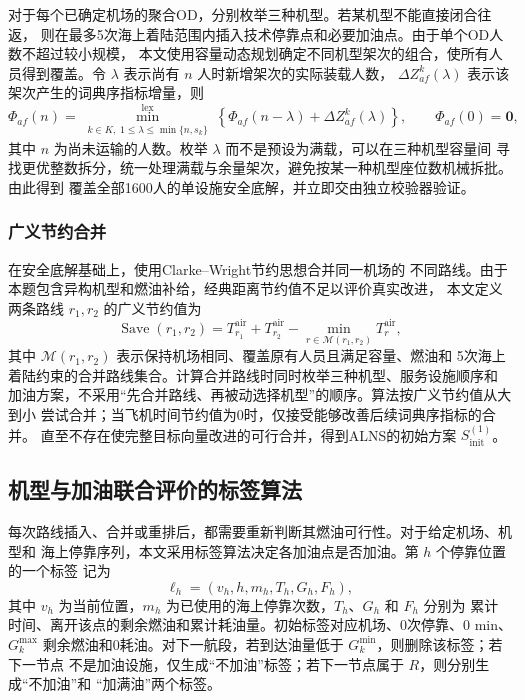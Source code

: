 \documentclass[UTF8,a4paper,zihao=5]{ctexart}
\begin{document}
对于每个已确定机场的聚合OD，分别枚举三种机型。若某机型不能直接闭合往返，
则在最多5次海上着陆范围内插入技术停靠点和必要加油点。由于单个OD人数不超过较小规模，
本文使用容量动态规划确定不同机型架次的组合，使所有人员得到覆盖。令
$\lambda$ 表示尚有 $n$ 人时新增架次的实际装载人数，
$\Delta Z_{af}^{k}(\lambda)$ 表示该架次产生的词典序指标增量，则
\begin{equation}
  \Phi_{af}(n)=
  \min_{\substack{k\in K,\;1\le\lambda\le\min\{n,s_k\}}}^{\mathrm{lex}}
  \left\{
    \Phi_{af}(n-\lambda)+\Delta Z_{af}^{k}(\lambda)
  \right\},
  \qquad \Phi_{af}(0)=\boldsymbol{0},
  \label{eq:q1-batch-dp}
\end{equation}
其中 $n$ 为尚未运输的人数。枚举 $\lambda$ 而不是预设为满载，可以在三种机型容量间
寻找更优整数拆分，统一处理满载与余量架次，避免按某一种机型座位数机械拆批。由此得到
覆盖全部1600人的单设施安全底解，并立即交由独立校验器验证。

\subsubsection{广义节约合并}

在安全底解基础上，使用Clarke--Wright节约思想\cite{clarke1964savings}合并同一机场的
不同路线。由于本题包含异构机型和燃油补给，经典距离节约值不足以评价真实改进，
本文定义两条路线 $r_1,r_2$ 的广义节约值为
\begin{equation}
  \operatorname{Save}(r_1,r_2)
  =T_{r_1}^{\mathrm{air}}+T_{r_2}^{\mathrm{air}}
  -\min_{r\in\mathcal{M}(r_1,r_2)}T_r^{\mathrm{air}},
  \label{eq:q1-generalized-saving}
\end{equation}
其中 $\mathcal{M}(r_1,r_2)$ 表示保持机场相同、覆盖原有人员且满足容量、燃油和
5次海上着陆约束的合并路线集合。计算合并路线时同时枚举三种机型、服务设施顺序和
加油方案，不采用“先合并路线、再被动选择机型”的顺序。算法按广义节约值从大到小
尝试合并；当飞机时间节约值为0时，仅接受能够改善后续词典序指标的合并。
直至不存在使完整目标向量改进的可行合并，得到ALNS的初始方案
$S_{\mathrm{init}}^{(1)}$。

\subsection{机型与加油联合评价的标签算法}

每次路线插入、合并或重排后，都需要重新判断其燃油可行性。对于给定机场、机型和
海上停靠序列，本文采用标签算法决定各加油点是否加油。第 $h$ 个停靠位置的一个标签
记为
\begin{equation}
  \ell_h=(v_h,h,m_h,T_h,G_h,F_h),
\end{equation}
其中 $v_h$ 为当前位置，$m_h$ 为已使用的海上停靠次数，$T_h$、$G_h$ 和 $F_h$ 分别为
累计时间、离开该点的剩余燃油和累计耗油量。初始标签对应机场、0次停靠、0 min、
$G_k^{\max}$ 剩余燃油和0耗油。对下一航段，若到达油量低于
$G_k^{\min}$，则删除该标签；若下一节点
不是加油设施，仅生成“不加油”标签；若下一节点属于 $R$，则分别生成“不加油”和
“加满油”两个标签。
\end{document}
